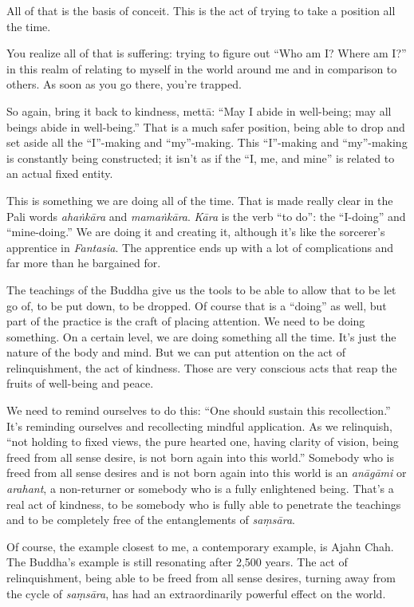 All of that is the basis of conceit. This is the act of trying to take a
position all the time.

You realize all of that is suffering: trying to figure out “Who am I?
Where am I?” in this realm of relating to myself in the world around me
and in comparison to others. As soon as you go there, you’re trapped.

So again, bring it back to kindness, mettā: “May I abide in well-being;
may all beings abide in well-being.” That is a much safer position,
being able to drop and set aside all the “I”-making and “my”-making.
This “I”-making and “my”-making is constantly being constructed; it
isn’t as if the “I, me, and mine” is related to an actual fixed entity.

This is something we are doing all of the time. That is made really
clear in the Pali words \emph{ahaṅkāra} and \emph{mamaṅkāra}.
\emph{Kāra} is the verb “to do”: the “I-doing” and “mine-doing.” We are
doing it and creating it, although it’s like the sorcerer’s apprentice
in \emph{Fantasia}. The apprentice ends up with a lot of complications
and far more than he bargained for.

The teachings of the Buddha give us the tools to be able to allow that
to be let go of, to be put down, to be dropped. Of course that is a
“doing” as well, but part of the practice is the craft of placing
attention. We need to be doing something. On a certain level, we are
doing something all the time. It’s just the nature of the body and mind.
But we can put attention on the act of relinquishment, the act of
kindness. Those are very conscious acts that reap the fruits of
well-being and peace.

We need to remind ourselves to do this: “One should sustain this
recollection.” It’s reminding ourselves and recollecting mindful
application. As we relinquish, “not holding to fixed views, the pure
hearted one, having clarity of vision, being freed from all sense
desire, is not born again into this world.” Somebody who is freed from
all sense desires and is not born again into this world is an
\emph{anāgāmi} or \emph{arahant}, a non-returner or somebody who is a
fully enlightened being. That’s a real act of kindness, to be somebody
who is fully able to penetrate the teachings and to be completely free
of the entanglements of \emph{saṃsāra}.

Of course, the example closest to me, a contemporary example, is Ajahn
Chah. The Buddha’s example is still resonating after 2,500 years. The
act of relinquishment, being able to be freed from all sense desires,
turning away from the cycle of \emph{saṃsāra}, has had an
extraordinarily powerful effect on the world.

